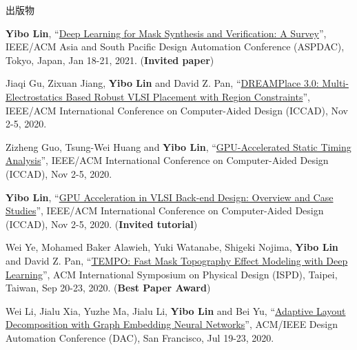 \begin{rSection}{出版物}
\begin{description}[font=\normalfont]
{}
            

\item[{[C43]}]{
        \textbf{Yibo Lin}, 
    ``\href{https://doi.org/10.1145/3394885.3431624}{Deep Learning for Mask Synthesis and Verification: A Survey}'', 
    IEEE/ACM Asia and South Pacific Design Automation Conference (ASPDAC), Tokyo, Japan, Jan 18-21, 2021.
    (\textbf{Invited paper})
}
            

\item[{[C42]}]{
        Jiaqi Gu, Zixuan Jiang, \textbf{Yibo Lin} and David Z. Pan, 
    ``\href{https://doi.org/10.1145/3400302.3415691}{DREAMPlace 3.0: Multi-Electrostatics Based Robust VLSI Placement with Region Constraints}'', 
    IEEE/ACM International Conference on Computer-Aided Design (ICCAD), Nov 2-5, 2020.
    
}
            

\item[{[C41]}]{
        Zizheng Guo, Tsung-Wei Huang and \textbf{Yibo Lin}, 
    ``\href{https://doi.org/10.1145/3400302.3415631}{GPU-Accelerated Static Timing Analysis}'', 
    IEEE/ACM International Conference on Computer-Aided Design (ICCAD), Nov 2-5, 2020.
    
}
            

\item[{[C40]}]{
        \textbf{Yibo Lin}, 
    ``\href{https://doi.org/10.1145/3400302.3415765}{GPU Acceleration in VLSI Back-end Design: Overview and Case Studies}'', 
    IEEE/ACM International Conference on Computer-Aided Design (ICCAD), Nov 2-5, 2020.
    (\textbf{Invited tutorial})
}
            

\item[{[C39]}]{
        Wei Ye, Mohamed Baker Alawieh, Yuki Watanabe, Shigeki Nojima, \textbf{Yibo Lin} and David Z. Pan, 
    ``\href{https://doi.org/10.1145/3372780.3375565}{TEMPO: Fast Mask Topography Effect Modeling with Deep Learning}'', 
    ACM International Symposium on Physical Design (ISPD), Taipei, Taiwan, Sep 20-23, 2020.
    (\textbf{Best Paper Award})
}
            

\item[{[C38]}]{
        Wei Li, Jialu Xia, Yuzhe Ma, Jialu Li, \textbf{Yibo Lin} and Bei Yu, 
    ``\href{https://doi.org/10.1109/DAC18072.2020.9218706}{Adaptive Layout Decomposition with Graph Embedding Neural Networks}'', 
    ACM/IEEE Design Automation Conference (DAC), San Francisco, Jul 19-23, 2020.
    
}
            


\end{description}
\end{rSection}
